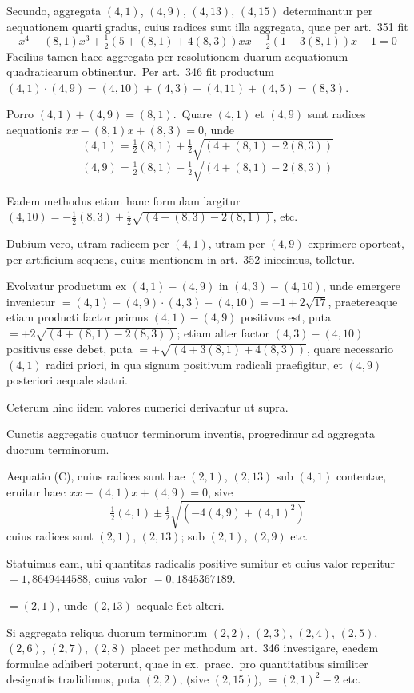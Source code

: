 \documentclass[12pt,a4paper]{article}
\theoremstyle{plain}
\theoremstyle{definition}
\theoremstyle{remark}
\begin{document}
Secundo, aggregata $(4,1)$, $(4,9)$, $(4,13)$, $(4,15)$ determinantur
per aequationem quarti gradus, cuius radices sunt illa aggregata, quae per
art.\ 351 fit
\[x^4-(8,1)x^3+\tfrac{1}{2}(5+(8,1)+4(8,3))xx-\tfrac{1}{2}(1+3(8,1))x-1=0\]
Facilius tamen haec aggregata per resolutionem duarum aequationum
quadraticarum obtinentur.\ Per art.\ 346 fit productum
$(4,1)\cdot(4,9)=(4,10)+(4,3)+(4,11)+(4,5)=(8,3)$.

Porro $(4,1)+(4,9)=(8,1)$.\ Quare $(4,1)$ et $(4,9)$ sunt radices
aequationis $xx-(8,1)x+(8,3)=0$, unde
\[(4,1) = \tfrac{1}{2}(8,1)+\tfrac{1}{2}\sqrt{(4+(8,1)-2(8,3))}\]
\[(4,9) = \tfrac{1}{2}(8,1)-\tfrac{1}{2}\sqrt{(4+(8,1)-2(8,3))}\]

Eadem methodus etiam hanc formulam largitur $(4,10)=-\frac{1}{2}(8,3)
+\frac{1}{2}\sqrt{(4+(8,3)-2(8,1))}$, etc.

Dubium vero, utram radicem per $(4,1)$, utram per $(4,9)$ exprimere
oporteat, per artificium sequens, cuius mentionem in art.\ 352 iniecimus,
tolletur.

Evolvatur productum ex $(4,1)-(4,9)$ in $(4,3)-(4,10)$, unde
emergere invenietur $=(4,1)-(4,9)\cdot(4,3)-(4,10)=-1+2\sqrt{17}$,
praetereaque etiam producti factor primus $(4,1)-(4,9)$ positivus est,
puta $=+2\sqrt{(4+(8,1)-2(8,3))}$; etiam alter factor
$(4,3)-(4,10)$ positivus esse debet, puta $=+\sqrt{(4+3(8,1)+4(8,3))}$,
quare necessario $(4,1)$ radici priori, in qua signum positivum radicali
praefigitur, et $(4,9)$ posteriori aequale statui.

Ceterum hinc iidem valores numerici derivantur ut supra.

Cunctis aggregatis quatuor terminorum inventis, progredimur ad
aggregata duorum terminorum.

Aequatio (C), cuius radices sunt hae $(2,1)$, $(2,13)$ sub $(4,1)$
contentae, eruitur haec $xx-(4,1)x+(4,9)=0$, sive
\[\tfrac{1}{2}(4,1)\pm\tfrac{1}{2}\sqrt{(-4(4,9)+(4,1)^2)}\]
cuius radices sunt $(2,1)$, $(2,13)$; sub $(2,1)$, $(2,9)$ etc.

Statuimus eam, ubi quantitas radicalis positive sumitur et cuius valor
reperitur $=1,8649444588$, cuius valor $=0,1845367189$.

$=(2,1)$, unde $(2,13)$ aequale fiet alteri.

Si aggregata reliqua duorum terminorum $(2,2)$, $(2,3)$, $(2,4)$,
$(2,5)$, $(2,6)$, $(2,7)$, $(2,8)$ placet per methodum art.\ 346
investigare, eaedem formulae adhiberi poterunt, quae in ex.\ praec.\ pro
quantitatibus similiter designatis tradidimus, puta $(2,2)$, (sive $(2,15)$),
$=(2,1)^2-2$ etc.
\end{document}
